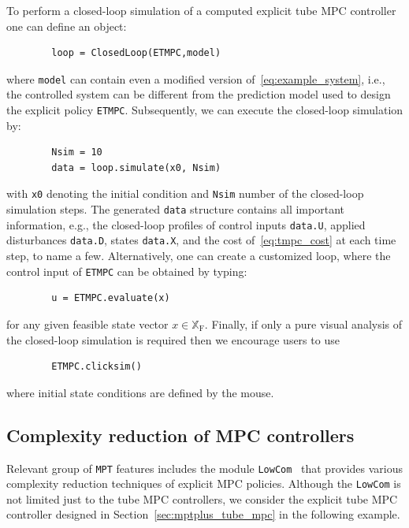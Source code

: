 \documentclass[letterpaper, 10 pt, conference]{ieeeconf}
\begin{document}
	To perform a closed-loop simulation of a computed explicit tube MPC controller one can define an object:
	\begin{verbatim}
		loop = ClosedLoop(ETMPC,model)
	\end{verbatim}
	where \verb|model| can contain even a modified version of~\eqref{eq:example_system}, i.e., the controlled system can be different from the prediction model used to design the explicit policy \verb|ETMPC|. Subsequently, we can execute the closed-loop simulation by:
	\begin{verbatim}
		Nsim = 10
		data = loop.simulate(x0, Nsim)
	\end{verbatim}	
	with \verb|x0| denoting the initial condition and \verb|Nsim| number of the closed-loop simulation steps. The generated \verb|data| structure contains all important information, e.g., the closed-loop profiles of control inputs \verb|data.U|, applied disturbances \verb|data.D|, states \verb|data.X|, and the cost of~\eqref{eq:tmpc_cost} at each time step, to name a few.
	Alternatively, one can create a customized loop, where the control input of \verb|ETMPC| can be obtained by typing: 
	\begin{verbatim}
		u = ETMPC.evaluate(x)
	\end{verbatim}
	for any given feasible state vector $x\in\mathbb{X}_{\mathrm{F}}$.
	Finally, if only a pure visual analysis of the closed-loop simulation is required then we encourage users to use
	\begin{verbatim}
		ETMPC.clicksim()
	\end{verbatim}
	where initial state conditions are defined by the mouse.
	
	\subsection{Complexity reduction of MPC controllers}
	\label{sec:code_mpt3lowcom}
	
	Relevant group of \texttt{MPT} features includes the module \texttt{LowCom}~\cite{KH15} that provides various complexity reduction techniques of explicit MPC policies. Although the \texttt{LowCom} is not limited just to the tube MPC controllers, we consider the explicit tube MPC controller designed in Section~\ref{sec:mptplus_tube_mpc} in the following example.
	
\end{document}
